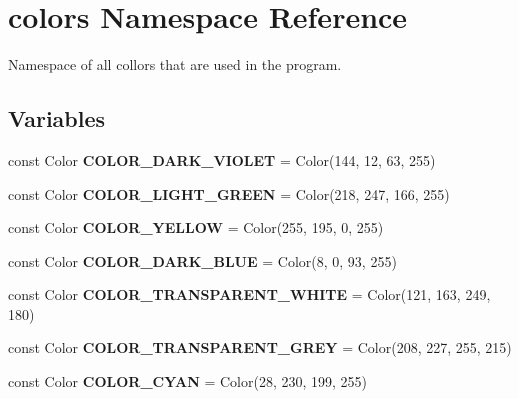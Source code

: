 \hypertarget{namespacecolors}{}\section{colors Namespace Reference}
\label{namespacecolors}


Namespace of all collors that are used in the program.  


\subsection*{Variables}
\begin{DoxyCompactItemize}
\item 
\mbox{\label{namespacecolors_a01345c8067b31e36683f913bdc80bbf9}} 
const Color {\bfseries C\+O\+L\+O\+R\+\_\+\+D\+A\+R\+K\+\_\+\+V\+I\+O\+L\+ET} = Color(144, 12, 63, 255)
\item 
\mbox{\label{namespacecolors_a5ddb5c6b64e7636c350048cc3540dba9}} 
const Color {\bfseries C\+O\+L\+O\+R\+\_\+\+L\+I\+G\+H\+T\+\_\+\+G\+R\+E\+EN} = Color(218, 247, 166, 255)
\item 
\mbox{\label{namespacecolors_a19cf6855cc072ef3d873baed05fbfdf7}} 
const Color {\bfseries C\+O\+L\+O\+R\+\_\+\+Y\+E\+L\+L\+OW} = Color(255, 195, 0, 255)
\item 
\mbox{\label{namespacecolors_a5972ab70cc3f9057c3a4e23c25746eda}} 
const Color {\bfseries C\+O\+L\+O\+R\+\_\+\+D\+A\+R\+K\+\_\+\+B\+L\+UE} = Color(8, 0, 93, 255)
\item 
\mbox{\label{namespacecolors_a529942c4feb5904a9773f25827ce3f0c}} 
const Color {\bfseries C\+O\+L\+O\+R\+\_\+\+T\+R\+A\+N\+S\+P\+A\+R\+E\+N\+T\+\_\+\+W\+H\+I\+TE} = Color(121, 163, 249, 180)
\item 
\mbox{\label{namespacecolors_acda08ec2914fcac205719a0a8216aed6}} 
const Color {\bfseries C\+O\+L\+O\+R\+\_\+\+T\+R\+A\+N\+S\+P\+A\+R\+E\+N\+T\+\_\+\+G\+R\+EY} = Color(208, 227, 255, 215)
\item 
\mbox{\label{namespacecolors_a68f80a43074540a1854c5143fb99d94b}} 
const Color {\bfseries C\+O\+L\+O\+R\+\_\+\+C\+Y\+AN} = Color(28, 230, 199, 255)

\end{DoxyCompactItemize}
